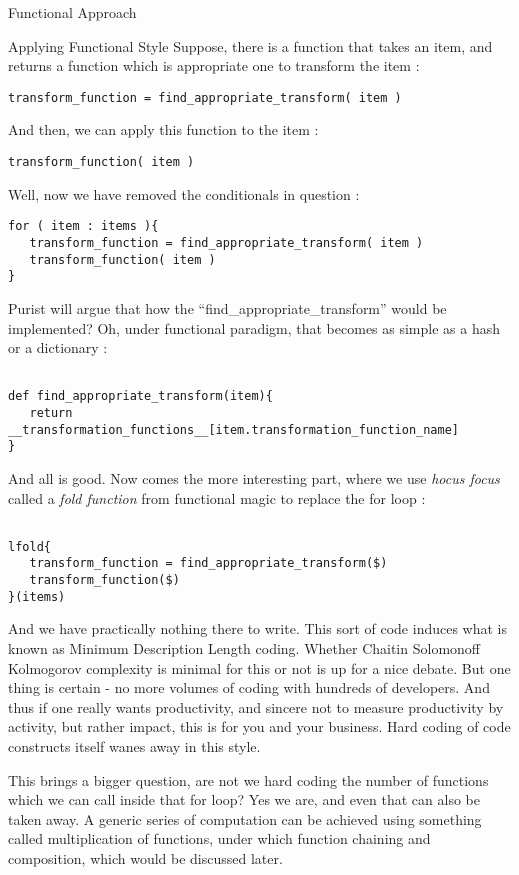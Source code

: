 \begin{section}{Functional Approach}
\begin{subsection}{Applying Functional Style}
Suppose, there is a function that takes an item, and returns a function 
which is appropriate one to transform the item :

\begin{lstlisting}[style=JexlStyle]
transform_function = find_appropriate_transform( item )
\end{lstlisting}

And then, we can apply this function to the item :

\begin{lstlisting}[style=JexlStyle]
transform_function( item )
\end{lstlisting}

Well, now we have removed the conditionals in question :

\begin{lstlisting}[style=JexlStyle]
for ( item : items ){
   transform_function = find_appropriate_transform( item )
   transform_function( item )
}
\end{lstlisting}


Purist will argue that how the ``find\_appropriate\_transform'' would be implemented? 
Oh, under functional paradigm, that becomes as simple as a hash or a dictionary :

\begin{lstlisting}[style=JexlStyle]

def find_appropriate_transform(item){
   return __transformation_functions__[item.transformation_function_name]
}

\end{lstlisting}


And all is good. Now comes the more interesting part, where we use \emph{hocus focus} called a \emph{fold function}  
from functional magic  to replace the for loop :

\begin{lstlisting}[style=JexlStyle]

lfold{
   transform_function = find_appropriate_transform($)
   transform_function($)
}(items)
\end{lstlisting}


And we have practically nothing there to write. This sort of code induces what is known as Minimum Description Length coding. Whether Chaitin Solomonoff Kolmogorov complexity is minimal for this or not is up for a nice debate. But one thing is certain - no more volumes of coding with hundreds of developers. And thus if one really wants productivity, and sincere not to measure productivity by activity, but rather impact, this is for you and your business. Hard coding of code constructs itself wanes away in this style.

This brings a bigger question, are not we hard coding the number of functions which we can call inside that for loop? Yes we are, and even that can also be taken away.  A generic series of computation can be achieved using something called multiplication of functions, under which function chaining and composition, which would be discussed later. 

\end{subsection}
\end{section}

